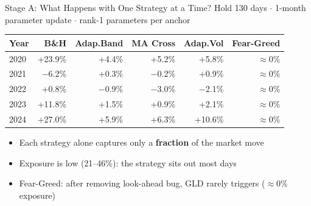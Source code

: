 \documentclass[aspectratio=169]{beamer}
\begin{document}
\begin{frame}{Stage A: What Happens with One Strategy at a Time?}
  \small
  Hold 130 days $\cdot$ 1-month parameter update $\cdot$ rank-1 parameters per anchor

  \vspace{0.4em}
  \begin{tabular}{lrrrrr}
    \toprule
    Year & B\&H & Adap.Band & MA Cross & Adap.Vol & Fear-Greed \\
    \midrule
    2020 & +23.9\% & +4.4\% & +5.2\% & +5.8\% & $\approx$0\% \\
    2021 & $-$6.2\%  & +0.3\% & $-$0.2\% & +0.9\% & $\approx$0\% \\
    2022 & +0.8\%  & $-$0.9\% & $-$3.0\% & $-$2.1\% & $\approx$0\% \\
    2023 & +11.8\% & +1.5\% & +0.9\% & +2.1\% & $\approx$0\% \\
    2024 & +27.0\% & +5.9\% & +6.3\% & +10.6\% & $\approx$0\% \\
    \bottomrule
  \end{tabular}

  \vspace{0.5em}
  \begin{itemize}
    \item Each strategy alone captures only a \textbf{fraction} of the market move
    \item Exposure is low (21--46\%): the strategy sits out most days
    \item Fear-Greed: after removing look-ahead bug, GLD rarely triggers ($\approx$0\% exposure)
  \end{itemize}
\end{frame}
\end{document}
